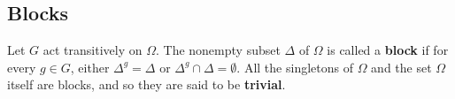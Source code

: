 \subsection{Blocks}
\begin{definition}
	Let $G$ act transitively on $\Omega$. The nonempty subset $\Delta$ of $\Omega$ is called a \textbf{block} if for every $g\in G$, either $\Delta^g=\Delta$ or $\Delta^g \cap \Delta = \emptyset$. All the singletons of $\Omega$ and the set $\Omega$ itself are blocks, and so they are said to be \textbf{trivial}.
\end{definition}
\begin{comment}
	\begin{proposition} \label{prop-block-and-stab}
		Let $G$ acts transitively on $X$. Let $x\in X$ be fixed. Then there is a one-to-one correspondence between the set of blocks of $X$ containing $x$ and the set of subgroups which contains the stabilizer $G_x$ of $x$. 
	\end{proposition}
	\begin{sketch}
		Let $B$ be a block containing $x \in X$, and consider the set $H_B = \{g \in G \mid gx \in B\}$. We claim that $H_B$ is a subgroup of  $G$. Clearly, $e \in H_B$. Let $g,g' \in H_B$. Since $x$ and $gx$ both lie in $B$, we see that $gB \cap B\neq \emptyset$  and hence that $gB = B$. Now we have $(gg')x = g(g'x) \in gB = B$ and hence $gg' \in H_B$. Also, for $g \in H_B$ we have $gx \in B$ and $g^{-1}(gx) = x \in B$. Thus $g^{-1}B \cap B \neq \emptyset$, which forces $g^{-1}B = B$. In particular,   $g^{-1}x \in B$ and hence  $g^{-1} \in H_B$. Therefore $H_B$ is a subgroup of $G$. 
		
		Observe that $G_x \le H_B$ since $x \in B$. Fix $x\in X$. Let $\mathcal{B}$ be the set of blocks of $X$ containing $x$ and let $\mathcal{H}$ be the set of subgroups containing $G_x$. Let $\theta:\mathcal{B}\rightarrow \mathcal{H}$ be the function defined by $\theta(B)=H_B$. We claim that $\theta$ is bijective. 
		
		Let $B$ and $B'$ be distinct blocks in $\mathcal{B}$. Without loss of generality assume that $B'\not\subseteq B$. Then there exists some  $y \in B'$ with $y \notin B$. Since $G$ acts transitively on $X$, there exists some $g \in G$ such that $gx = y$. So $g \in H_{B'}$. Since $y\not\in B$, we have $g \notin H_B$, and hence $H_B \ne H_{B'}$. This shows that $\theta$ is injective.
		
		Let $H\in\mathcal{H}$. Consider the subset $C = \{hx \mid h \in H\}$ of $X$. We show that $C$ is a block. Clearly $C$ is non-empty and  $gC = C$ for each $g\in H$. Let $g \in G$ be such that $gC \cap C\neq \emptyset$. Then there exist $h_1, h_2 \in H$ such that $gh_1x = h_2x$. This gives $h_2^{-1}gh_1x = x$ and hence $h_2^{-1}gh_1 \in G_x \le H$, and thus $g \in H$. Consequently $gC  = C$. Therefore $C$ is a block. Note that $\theta(C) = H_C = \{g \in G \mid gx \in C\}$. Clearly $H \le H_C$. Let $g \in H_C$. Then $gx = hx$ for some $h \in H$. Hence $h^{-1}gx = x$ and thus $h^{-1}g  \in H$, giving $g \in H$. So $\theta(C) = H$, which shows that $\theta$ is surjective.
	\end{sketch}
\end{comment}

